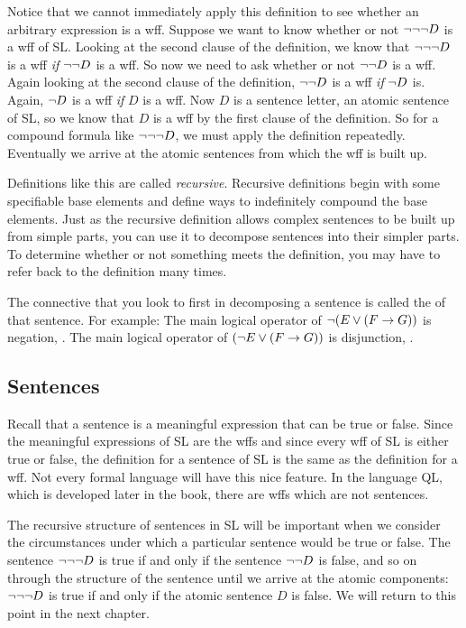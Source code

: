 Notice that we cannot immediately apply this definition to see whether an arbitrary expression is a wff. Suppose we want to know whether or not $\neg \neg \neg D$ is a wff of SL. Looking at the second clause of the definition, we know that $\neg \neg \neg D$ is a wff \emph{if} $\neg \neg D$ is a wff. So now we need to ask whether or not $\neg \neg D$ is a wff. Again looking at the second clause of the definition, $\neg \neg D$ is a wff \emph{if} $\neg D$ is. Again, $\neg D$ is a wff \emph{if} $D$ is a wff. Now $D$ is a sentence letter, an atomic sentence of SL, so we know that $D$ is a wff by the first clause of the definition. So for a compound formula like $\neg \neg \neg D$, we must apply the definition repeatedly. Eventually we arrive at the atomic sentences from which the wff is built up.

Definitions like this are called \emph{recursive}. Recursive definitions begin with some specifiable base elements and define ways to indefinitely compound the base elements. Just as the recursive definition allows complex sentences to be built up from simple parts, you can use it to decompose sentences into their simpler parts. To determine whether or not something meets the definition, you may have to refer back to the definition many times.

The connective that you look to first in decomposing a sentence is called the  of that sentence. For example: The main logical operator of $\neg (E \vee (F \rightarrow G))$ is negation, \enot. The main logical operator of $(\neg E \vee (F \rightarrow G))$ is disjunction, \eor.


\subsection{Sentences}
Recall that a sentence is a meaningful expression that can be true or false. Since the meaningful expressions of SL are the wffs and since every wff of SL is either true or false, the definition for a sentence of SL is the same as the definition for a wff. Not every formal language will have this nice feature. In the language QL, which is developed later in the book, there are wffs which are not sentences. 

The recursive structure of sentences in SL will be important when we consider the circumstances under which a particular sentence would be true or false. The sentence $\neg \neg \neg D$ is true if and only if the sentence $\neg \neg D$ is false, and so on through the structure of the sentence until we arrive at the atomic components: $\neg \neg \neg D$ is true if and only if the atomic sentence $D$ is false. We will return to this point in the next chapter.


